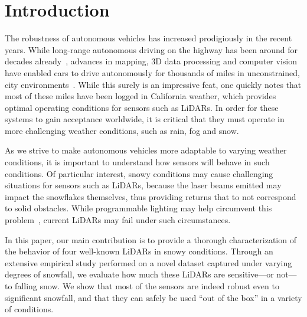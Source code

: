 \section{Introduction}

The robustness of autonomous vehicles has increased prodigiously in the recent years. While long-range autonomous driving on the highway has been around for decades already~\cite{Pomerleau_1996_616}, advances in mapping, 3D data processing and computer vision have enabled cars to drive autonomously for thousands of miles in unconstrained, city environments~. While this surely is an impressive feat, one quickly notes that most of these miles have been logged in California weather, which provides optimal operating conditions for sensors such as LiDARs. In order for these systems to gain acceptance worldwide, it is critical that they must operate in more challenging weather conditions, such as rain, fog and snow. 

As we strive to make autonomous vehicles more adaptable to varying weather conditions, it is important to understand how sensors will behave in such conditions. Of particular interest, snowy conditions may cause challenging situations for sensors such as LiDARs, because the laser beams emitted may impact the snowflakes themselves, thus providing returns that to not correspond to solid obstacles. While programmable lighting may help circumvent this problem~, current LiDARs may fail under such circumstances. 

In this paper, our main contribution is to provide a thorough characterization of the behavior of four well-known LiDARs in snowy conditions. Through an extensive empirical study performed on a novel dataset captured under varying degrees of snowfall, we evaluate how much these LiDARs are sensitive---or not---to falling snow. We show that most of the sensors are indeed robust even to significant snowfall, and that they can safely be used ``out of the box'' in a variety of conditions. 


